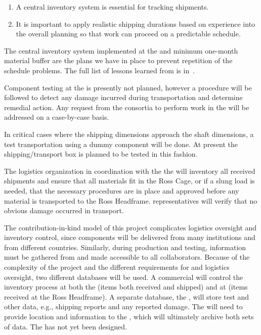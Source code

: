 \begin{enumerate}
\item A central inventory system is essential for tracking  shipments.
\item 
It is important to apply realistic shipping durations based on experience into the overall planning so that work can proceed on a predictable schedule. 
 
\end{enumerate}

The central inventory system  implemented at the   and minimum one-month material buffer are the plans we have in place to prevent repetition of the  schedule problems. 
The full list of lessons learned from  is in~\cite{bib:docdb8255}. 

Component testing at the  is presently not planned, however a   procedure will be followed to detect any damage incurred during transportation and determine remedial action. Any request from the consortia to perform work in the  will be addressed on a case-by-case basis.

In critical cases where the shipping dimensions approach the shaft dimensions, a test transportation using a dummy component will be done. At present the  shipping/transport box is planned to be tested in this fashion.
 
The logistics organization in coordination with the the  will inventory all received shipments and  ensure that all materials fit in the Ross Cage, or if a slung load is needed, that the necessary procedures are in place and approved before any material is transported to the Ross Headframe.  
 representatives will verify that no obvious damage occurred in transport. 

The contribution-in-kind model of this project complicates logistics oversight and inventory control, since components will be delivered from many institutions and from different countries. 
Similarly, during production and testing,  information must be gathered from and made accessible to all collaborators. 
Because of the complexity of the project and the different requirements for  and logistics oversight, two different databases will be used. 
A commercial  will control the inventory process at both the  (items both received and shipped) and at  (items received at the Ross Headframe). 
A  separate database, the , will store test and other  data, e.g.,  shipping reports and any reported damage. 
The  will need to provide location and   information to the , which will ultimately archive both sets of data. 
The  has not yet been designed.

